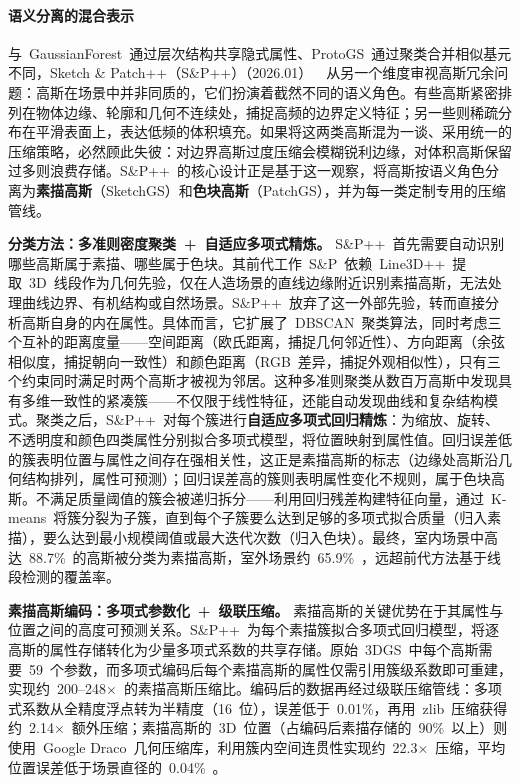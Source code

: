 \paragraph{语义分离的混合表示}

与~GaussianForest~通过层次结构共享隐式属性、ProtoGS~通过聚类合并相似基元不同，Sketch \& Patch++（S\&P++）（2026.01）~\cite{2601_05394}~从另一个维度审视高斯冗余问题：高斯在场景中并非同质的，它们扮演着截然不同的语义角色。有些高斯紧密排列在物体边缘、轮廓和几何不连续处，捕捉高频的边界定义特征；另一些则稀疏分布在平滑表面上，表达低频的体积填充。如果将这两类高斯混为一谈、采用统一的压缩策略，必然顾此失彼：对边界高斯过度压缩会模糊锐利边缘，对体积高斯保留过多则浪费存储。S\&P++~的核心设计正是基于这一观察，将高斯按语义角色分离为\textbf{素描高斯}（SketchGS）和\textbf{色块高斯}（PatchGS），并为每一类定制专用的压缩管线。

\textbf{分类方法：多准则密度聚类~+~自适应多项式精炼。}
S\&P++~首先需要自动识别哪些高斯属于素描、哪些属于色块。其前代工作~S\&P~依赖~Line3D++~提取~3D~线段作为几何先验，仅在人造场景的直线边缘附近识别素描高斯，无法处理曲线边界、有机结构或自然场景。S\&P++~放弃了这一外部先验，转而直接分析高斯自身的内在属性。具体而言，它扩展了~DBSCAN~聚类算法，同时考虑三个互补的距离度量——空间距离（欧氏距离，捕捉几何邻近性）、方向距离（余弦相似度，捕捉朝向一致性）和颜色距离（RGB~差异，捕捉外观相似性），只有三个约束同时满足时两个高斯才被视为邻居。这种多准则聚类从数百万高斯中发现具有多维一致性的紧凑簇——不仅限于线性特征，还能自动发现曲线和复杂结构模式。聚类之后，S\&P++~对每个簇进行\textbf{自适应多项式回归精炼}：为缩放、旋转、不透明度和颜色四类属性分别拟合多项式模型，将位置映射到属性值。回归误差低的簇表明位置与属性之间存在强相关性，这正是素描高斯的标志（边缘处高斯沿几何结构排列，属性可预测）；回归误差高的簇则表明属性变化不规则，属于色块高斯。不满足质量阈值的簇会被递归拆分——利用回归残差构建特征向量，通过~K-means~将簇分裂为子簇，直到每个子簇要么达到足够的多项式拟合质量（归入素描），要么达到最小规模阈值或最大迭代次数（归入色块）。最终，室内场景中高达~88.7\%~的高斯被分类为素描高斯，室外场景约~65.9\%~，远超前代方法基于线段检测的覆盖率。

\textbf{素描高斯编码：多项式参数化~+~级联压缩。}
素描高斯的关键优势在于其属性与位置之间的高度可预测关系。S\&P++~为每个素描簇拟合多项式回归模型，将逐高斯的属性存储转化为少量多项式系数的共享存储。原始~3DGS~中每个高斯需要~59~个参数，而多项式编码后每个素描高斯的属性仅需引用簇级系数即可重建，实现约~200--248$\times$~的素描高斯压缩比。编码后的数据再经过级联压缩管线：多项式系数从全精度浮点转为半精度（16~位），误差低于~0.01\%，再用~zlib~压缩获得约~2.14$\times$~额外压缩；素描高斯的~3D~位置（占编码后素描存储的~90\%~以上）则使用~Google Draco~几何压缩库，利用簇内空间连贯性实现约~22.3$\times$~压缩，平均位置误差低于场景直径的~0.04\%~。

